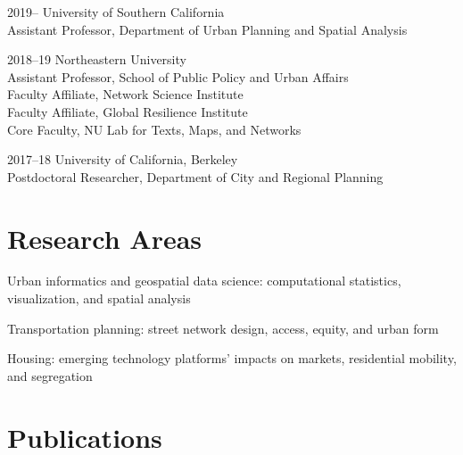 \documentclass[12pt,letterpaper]{report}
\newcommand{\listitemspace}{0.25em}
\renewenvironment{itemize}
{\begin{list}{}{\setlength{\leftmargin}{0em}
                \setlength{\parskip}{0em}
                \setlength{\itemsep}{\listitemspace}
                \setlength{\parsep}{\listitemspace}}}
{\end{list}}
\begin{document}
    \begin{tablist}

        \item[2019--]   \tab University of Southern California \\
                             Assistant Professor, Department of Urban Planning and Spatial Analysis

        \item[2018--19] \tab Northeastern University \\
                             Assistant Professor, School of Public Policy and Urban Affairs \\
                             Faculty Affiliate, Network Science Institute \\
                             Faculty Affiliate, Global Resilience Institute \\
                             Core Faculty, NU Lab for Texts, Maps, and Networks

        \item[2017--18] \tab University of California, Berkeley \\
                             Postdoctoral Researcher, Department of City and Regional Planning

    \end{tablist}



    \section*{Research Areas}

    \begin{itemize}

        \item Urban informatics and geospatial data science: computational statistics, visualization, and spatial analysis
        \item Transportation planning: street network design, access, equity, and urban form
        \item Housing: emerging technology platforms' impacts on markets, residential mobility, and segregation

    \end{itemize}



    \section*{Publications}
\end{document}
